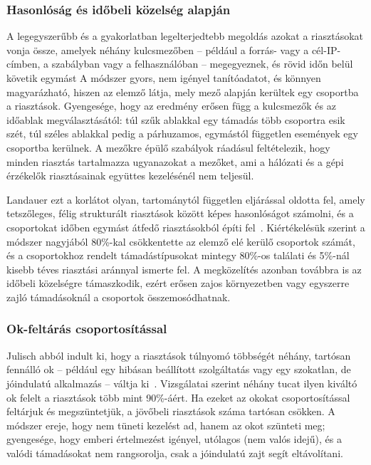 \subsubsection{Hasonlóság és időbeli közelség alapján}
A legegyszerűbb és a gyakorlatban legelterjedtebb megoldás azokat a riasztásokat vonja össze, amelyek néhány kulcsmezőben -- például a forrás- vagy a cél-IP-címben, a szabályban vagy a felhasználóban -- megegyeznek, és rövid időn belül követik egymást  A módszer gyors, nem igényel tanítóadatot, és könnyen magyarázható, hiszen az elemző látja, mely mező alapján kerültek egy csoportba a riasztások. Gyengesége, hogy az eredmény erősen függ a kulcsmezők és az időablak megválasztásától: túl szűk ablakkal egy támadás több csoportra esik szét, túl széles ablakkal pedig a párhuzamos, egymástól független események egy csoportba kerülnek. A mezőkre épülő szabályok ráadásul feltételezik, hogy minden riasztás tartalmazza ugyanazokat a mezőket, ami a hálózati és a gépi érzékelők riasztásainak együttes kezelésénél nem teljesül.

Landauer ezt a korlátot olyan, tartománytól független eljárással oldotta fel, amely tetszőleges, félig strukturált riasztások között képes hasonlóságot számolni, és a csoportokat időben egymást átfedő riasztásokból építi fel~\cite{landauer2022}. Kiértékelésük szerint a módszer nagyjából 80\%-kal csökkentette az elemző elé kerülő csoportok számát, és a csoportokhoz rendelt támadástípusokat mintegy 80\%-os találati és 5\%-nál kisebb téves riasztási aránnyal ismerte fel. A megközelítés azonban továbbra is az időbeli közelségre támaszkodik, ezért erősen zajos környezetben vagy egyszerre zajló támadásoknál a csoportok összemosódhatnak.

\subsubsection{Ok-feltárás csoportosítással}
Julisch abból indult ki, hogy a riasztások túlnyomó többségét néhány, tartósan fennálló ok -- például egy hibásan beállított szolgáltatás vagy egy szokatlan, de jóindulatú alkalmazás -- váltja ki~\cite{julisch2003}. Vizsgálatai szerint néhány tucat ilyen kiváltó ok felelt a riasztások több mint 90\%-áért. Ha ezeket az okokat csoportosítással feltárjuk és megszüntetjük, a jövőbeli riasztások száma tartósan csökken. A módszer ereje, hogy nem tüneti kezelést ad, hanem az okot szünteti meg; gyengesége, hogy emberi értelmezést igényel, utólagos (nem valós idejű), és a valódi támadásokat nem rangsorolja, csak a jóindulatú zajt segít eltávolítani.

